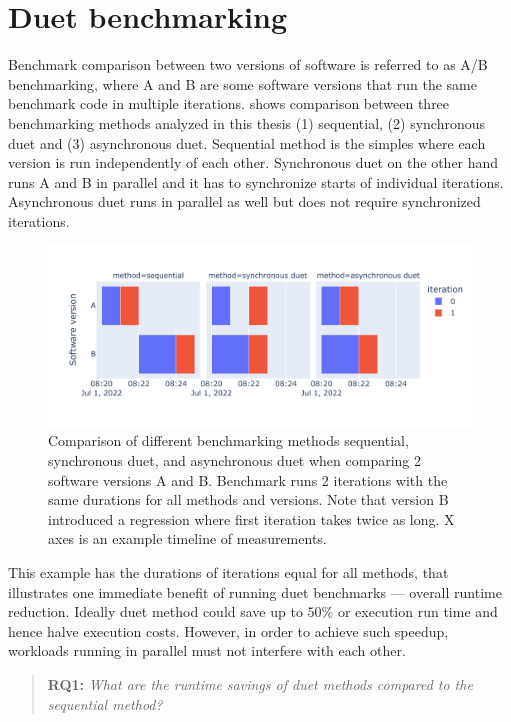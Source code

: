\chapter{Duet benchmarking}
\label{chap:duet}

Benchmark comparison between two versions of software is referred to as A/B benchmarking, where A and B are some software versions that run the same benchmark code in multiple iterations.
 shows comparison between three benchmarking methods analyzed in this thesis (1) sequential, (2) synchronous duet and (3) asynchronous duet.
Sequential method is the simples where each version is run independently of each other.
Synchronous duet on the other hand runs A and B in parallel and it has to synchronize starts of individual iterations.
Asynchronous duet runs in parallel as well but does not require synchronized iterations.

\begin{figure}
	\centering
	\includegraphics[width=.9\linewidth]{./figures/method_timeline.pdf}
	\caption{
	Comparison of different benchmarking methods sequential, synchronous duet, and asynchronous duet when comparing 2 software versions A and B.
	Benchmark runs 2 iterations with the same durations for all methods and versions.
	Note that version B introduced a regression where first iteration takes twice as long.
	X axes is an example timeline of measurements.
	}
	\label{fig:method_timeline}
\end{figure}

This example has the durations of iterations equal for all methods, that illustrates one immediate benefit of running duet benchmarks --- overall runtime reduction.
Ideally duet method could save up to $50\%$ or execution run time and hence halve execution costs.
However, in order to achieve such speedup, workloads running in parallel must not interfere with each other.

\begin{quote}
	\textbf{RQ1:} \emph{What are the runtime savings of duet methods compared to the sequential method?}
\end{quote}

